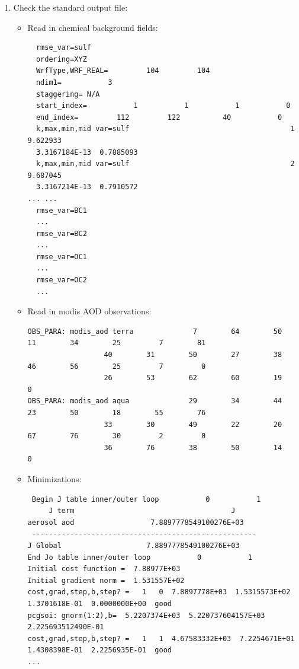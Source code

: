 \begin{enumerate}
\item Check the standard output file: \\

\begin{itemize}
\item Read in chemical background fields:
\begin{scriptsize}
\begin{verbatim}
  rmse_var=sulf
  ordering=XYZ
  WrfType,WRF_REAL=         104         104
  ndim1=           3
  staggering= N/A
  start_index=           1           1           1           0
  end_index=         112         122          40           0
  k,max,min,mid var=sulf                                      1   9.622933
  3.3167184E-13  0.7885093
  k,max,min,mid var=sulf                                      2   9.687045  
  3.3167214E-13  0.7910572
... ...
  rmse_var=BC1
  ...
  rmse_var=BC2
  ...
  rmse_var=OC1
  ...
  rmse_var=OC2
  ...

\end{verbatim}
\end{scriptsize}

\item Read in modis AOD observations:
\begin{tiny}
\begin{verbatim}
OBS_PARA: modis_aod terra              7        64        50        11        34        25         7        81
                  40        31        50        27        38        46        56        25         7         0
                  26        53        62        60        19         0
OBS_PARA: modis_aod aqua              29        34        44        23        50        18        55        76
                  33        30        49        22        20        67        76        30         2         0
                  36        76        38        50        14         0
\end{verbatim}
\end{tiny}

\item Minimizations:
\begin{scriptsize}
\begin{verbatim}
 Begin J table inner/outer loop           0           1
     J term                                     J
aerosol aod                  7.8897778549100276E+03
 -----------------------------------------------------
J Global                    7.8897778549100276E+03
End Jo table inner/outer loop           0           1
Initial cost function =  7.88977E+03
Initial gradient norm =  1.531557E+02
cost,grad,step,b,step? =   1   0  7.8897778E+03  1.5315573E+02  1.3701618E-01  0.0000000E+00  good
pcgsoi: gnorm(1:2),b=  5.2207374E+03  5.220737604157E+03  2.225693512490E-01
cost,grad,step,b,step? =   1   1  4.67583332E+03  7.2254671E+01  1.4308398E-01  2.2256935E-01  good
...


\end{verbatim}
\end{scriptsize}
\end{itemize}
\end{enumerate}
